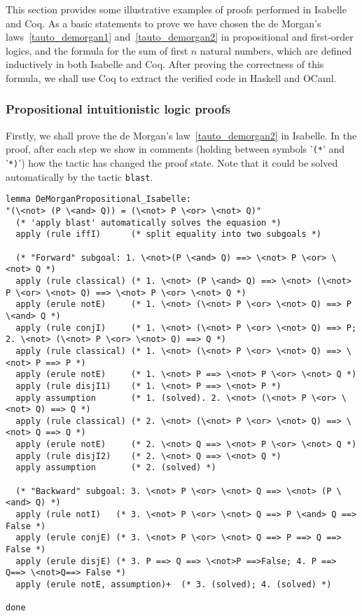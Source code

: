 \documentclass[article]{aaltoseries}
\begin{document}
This section provides some illustrative examples of proofs performed in Isabelle and Coq. As a basic statements to prove we have chosen the de Morgan's laws~\ref{tauto_demorgan1} and~\ref{tauto_demorgan2} in propositional and first-order logics, and the formula for the sum of first $n$ natural numbers, which are defined inductively in both Isabelle and Coq. After proving the correctness of this formula, we shall use Coq to extract the verified code in Haskell and OCaml.


\subsubsection{Propositional intuitionistic logic proofs}

Firstly, we shall prove the de Morgan's law~\eqref{tauto_demorgan2} in Isabelle. In the proof, after each step we show in comments (holding between symbols '\texttt{(*}' and '\texttt{*)}') how the tactic has changed the proof state.
 Note that it could be solved automatically by the tactic \texttt{blast}.
\begin{lstlisting}[language=isabelle, caption={Proof of the de Morgan's law for propositions in Isabelle}, label={ex_morgan_propos_isabelle}]
lemma DeMorganPropositional_Isabelle:
"(\<not> (P \<and> Q)) = (\<not> P \<or> \<not> Q)"
  (* 'apply blast' automatically solves the equasion *)
  apply (rule iffI)      (* split equality into two subgoals *)

  (* "Forward" subgoal: 1. \<not>(P \<and> Q) ==> \<not> P \<or> \<not> Q *)
  apply (rule classical) (* 1. \<not> (P \<and> Q) ==> \<not> (\<not> P \<or> \<not> Q) ==> \<not> P \<or> \<not> Q *)
  apply (erule notE)     (* 1. \<not> (\<not> P \<or> \<not> Q) ==> P \<and> Q *)
  apply (rule conjI)     (* 1. \<not> (\<not> P \<or> \<not> Q) ==> P; 2. \<not> (\<not> P \<or> \<not> Q) ==> Q *)
  apply (rule classical) (* 1. \<not> (\<not> P \<or> \<not> Q) ==> \<not> P ==> P *)
  apply (erule notE)     (* 1. \<not> P ==> \<not> P \<or> \<not> Q *)
  apply (rule disjI1)    (* 1. \<not> P ==> \<not> P *)
  apply assumption       (* 1. (solved). 2. \<not> (\<not> P \<or> \<not> Q) ==> Q *)
  apply (rule classical) (* 2. \<not> (\<not> P \<or> \<not> Q) ==> \<not> Q ==> Q *)
  apply (erule notE)     (* 2. \<not> Q ==> \<not> P \<or> \<not> Q *)
  apply (rule disjI2)    (* 2. \<not> Q ==> \<not> Q *)
  apply assumption       (* 2. (solved) *)

  (* "Backward" subgoal: 3. \<not> P \<or> \<not> Q ==> \<not> (P \<and> Q) *)
  apply (rule notI)   (* 3. \<not> P \<or> \<not> Q ==> P \<and> Q ==> False *)   
  apply (erule conjE) (* 3. \<not> P \<or> \<not> Q ==> P ==> Q ==> False *)
  apply (erule disjE) (* 3. P ==> Q ==> \<not>P ==>False; 4. P ==> Q==> \<not>Q==> False *)
  apply (erule notE, assumption)+  (* 3. (solved); 4. (solved) *)

done
\end{lstlisting}
\end{document}
